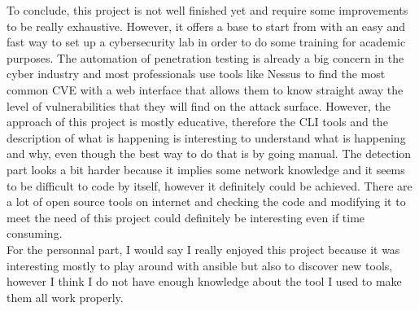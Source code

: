 To conclude, this project is not well finished yet and require some improvements to be really exhaustive. However, it offers a base to start from with an easy and fast way to set up a cybersecurity lab in order to do some training for academic purposes. The automation of penetration testing is already a big concern in the cyber industry and most professionals use tools like Nessus to find the most common CVE with a web interface that allows them to know straight away the level of vulnerabilities that they will find on the attack surface. However, the approach of this project is mostly educative, therefore the CLI tools and the description of what is happening is interesting to understand what is happening and why, even though the best way to do that is by going manual. The detection part looks a bit harder because it implies some network knowledge and it seems to be difficult to code by itself, however it definitely could be achieved. There are a lot of open source tools on internet and checking the code and modifying it to meet the need of this project could definitely be interesting even if time consuming. \\

For the personnal part, I would say I really enjoyed this project because it was interesting mostly to play around with ansible but also to discover new tools, however I think I do not have enough knowledge about the tool I used to make them all work properly.